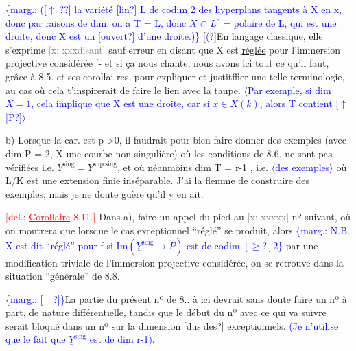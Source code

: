 \documentclass[11pt]{article}
\newcommand{\scanpage}[1]{\par\bigskip\noindent{\small\sffamily[scan #1]}\par}
\newcommand{\mspage}[1]{{\small\sffamily[p.\,#1]}}
\newcommand{\hand}[1]{\textcolor{blue}{#1}}
\let\over\relax
\newcommand{\over}[2]{\textcolor{gray}{#1}\textcolor{blue}{\ensuremath{^{\!\nearrow}}#2}}
\newcommand{\inserted}[2][]{\textcolor{blue}{$\langle$#2$\rangle$}}
\newcommand{\margin}[1]{\textcolor{blue}{\{\textsf{marg.:} #1\}}}
\newcommand{\deleted}[1]{\textcolor{red}{[\textsf{del.:} #1]}}
\newcommand{\xout}[1]{\textcolor{gray}{[\textsf{x:} #1]}}
\newcommand{\uline}[1]{\underline{#1}}
\newcommand{\unsure}[1]{[#1?]}
\newcommand{\illegible}[1]{[\textsf{illeg.\ #1}]}
\begin{document}
\mspage{46}

\clearpage
\scanpage{25/47}
\margin{(\unsure{$\uparrow$|?} la variété \unsure{lin} L de codim 2 des hyperplans tangents à X en x, donc par raisons de dim. on a T = L, donc $X \subset L^{\circ}$ = polaire de L, qui est une droite, donc X est un \unsure{\uline{ouvert}} d'une droite.)}
\mspage{48}
\unsure{\hand{(}}En langage classique, elle s'exprime \xout{xxxdisant} sauf erreur en disant
que X est \uline{réglée} pour l'immersion projective considérée \hand{[}- et si ça nous
chante, nous avons ici  tout ce qu'il faut, grâce à 8.5. et ses corollai
res, pour expliquer et justitffier une telle terminologie, au cas où cela
t'inspirerait de faire le lien avec la taupe\over{)}{]}. \inserted{Par exemple, si dim $X=1$, cela implique que X est une droite, car si $x \in X(k)$, alors T contient \unsure{$\uparrow$|P}}

b)  Lorsque la car. est p >0, il faudrait pour bien faire donner
des exemples (avec dim P = 2, X une courbe non singulière) où  les
conditions de 8.6. ne sont pas vérifiées i.e. $\underline{Y}^{\mathrm{sing}} = \underline{Y}^{\mathrm{sup\ sing}}$, et où
néanmoins  dim T = r-1 , i.e. \inserted{des exemples} où  L/K est une extension finie
inséparable.  J'ai la flemme de construire des exemples, mais je ne
doute guère qu'il y en ait.

\deleted{\uline{Corollaire} 8.11.} Dans a), faire un appel du pied au \xout{xxxxx} nº suivant,
où on montrera que lorsque le cas exceptionnel ``réglé'' se produit, alors \margin{N.B. X est dit ``réglé'' pour f si $\mathrm{Im}(\underline{Y}^{\mathrm{sing}} \to \check{P})$ est de codim $\unsure{\geq} 2$}
par une modification triviale de l'immersion projective considérée, on
se retrouve dans la situation  ``générale''  de 8.8.

\margin{\unsure{$\|$}}La partie du présent nº de 8.\over{\illegible{1}}{6}. à ici  devrait sans doute faire
un nº à part, de nature différentielle,  tandis que le début du nº avec
ce qui va suivre serait bloqué dans un nº  sur  la dimension \unsure{dus|des}
exceptionnels. \hand{(Je n'utilise que le fait que $\underline{Y}^{\mathrm{sing}}$ est de
dim r-1).}
\end{document}
